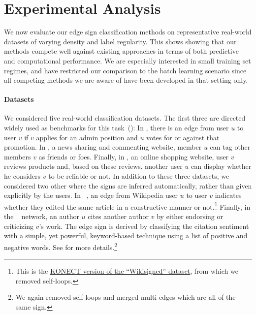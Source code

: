 \section{Experimental Analysis}\label{s:exp}

We now evaluate our edge sign classification methods on representative real-world datasets of
varying density and label regularity. This shows showing that our methods compete well against
existing approaches in terms of both predictive and computational performance. We are especially
interested in small training set regimes, and have restricted our comparison to the batch learning
scenario since all competing methods we are aware of have been developed in that setting only.

\paragraph{Datasets}

We considered five real-world classification datasets. The first three are directed \ssn{} widely
used as benchmarks for this task~(\eg{}\autocites{Leskovec2010}{shahriari2014ranking}{wu2016troll}):
In \wik{}, there is an edge from user $u$ to user $v$ if $v$ applies for an admin position and $u$
votes for or against that promotion. In \sla{}, a news sharing and commenting website, member $u$
can tag other members $v$ as friends or foes. Finally, in \epi{}, an online shopping website, user
$v$ reviews products and, based on these reviews, another user $u$ can display whether he considers
$v$ to be reliable or not. In addition to these three datasets, we considered two other \ssn{} where
the signs are inferred automatically, rather than given explicitly by the users.  In
\kiw{}~\cite{wikiedits11}, an edge from Wikipedia user $u$ to user $v$ indicates whether they edited
the same article in a constructive manner or not.\footnote{This is the
\href{http://konect.uni-koblenz.de/networks/wikisigned-k2}{KONECT version of the
\enquote{Wikisigned} dataset}, from which we removed self-loops.} Finally, in the
\aut{}~\cite{kumar2016structure} network, an author $u$ cites another author $v$ by either endorsing
or criticizing $v$'s work. The edge sign is derived by classifying the citation sentiment with a
simple, yet powerful, keyword-based technique using a list of positive and negative words. See
\cite{kumar2016structure} for more details.\footnote{We again removed self-loops and merged
multi-edges which are all of the same sign.}

